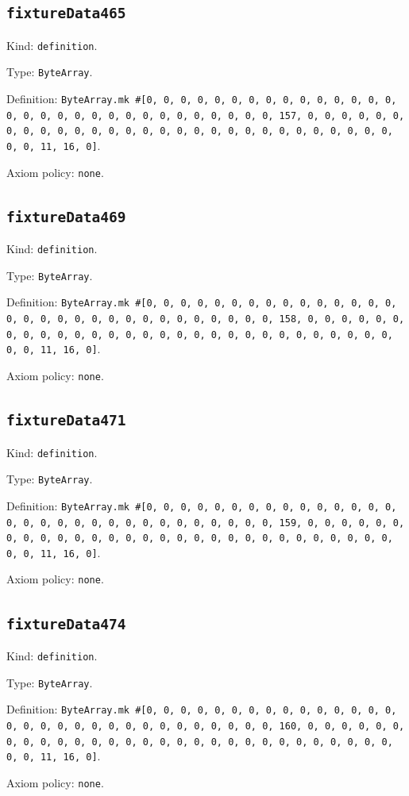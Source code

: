 \documentclass[11pt]{article}
\begin{document}
\subsection*{\texttt{fixtureData465}}
\noindent Kind: \texttt{definition}.\par
\noindent Type: \texttt{ByteArray}.\par
\noindent Definition: \texttt{ByteArray.mk \#[0, 0, 0, 0, 0, 0, 0, 0, 0, 0, 0, 0, 0, 0, 0, 0, 0, 0, 0, 0, 0, 0, 0, 0, 0, 0, 0, 0, 0, 0, 0, 157, 0, 0, 0, 0, 0, 0, 0, 0, 0, 0, 0, 0, 0, 0, 0, 0, 0, 0, 0, 0, 0, 0, 0, 0, 0, 0, 0, 0, 0, 0, 0, 11, 16, 0]}.\par
\noindent Axiom policy: \texttt{none}.\par
\subsection*{\texttt{fixtureData469}}
\noindent Kind: \texttt{definition}.\par
\noindent Type: \texttt{ByteArray}.\par
\noindent Definition: \texttt{ByteArray.mk \#[0, 0, 0, 0, 0, 0, 0, 0, 0, 0, 0, 0, 0, 0, 0, 0, 0, 0, 0, 0, 0, 0, 0, 0, 0, 0, 0, 0, 0, 0, 0, 158, 0, 0, 0, 0, 0, 0, 0, 0, 0, 0, 0, 0, 0, 0, 0, 0, 0, 0, 0, 0, 0, 0, 0, 0, 0, 0, 0, 0, 0, 0, 0, 11, 16, 0]}.\par
\noindent Axiom policy: \texttt{none}.\par
\subsection*{\texttt{fixtureData471}}
\noindent Kind: \texttt{definition}.\par
\noindent Type: \texttt{ByteArray}.\par
\noindent Definition: \texttt{ByteArray.mk \#[0, 0, 0, 0, 0, 0, 0, 0, 0, 0, 0, 0, 0, 0, 0, 0, 0, 0, 0, 0, 0, 0, 0, 0, 0, 0, 0, 0, 0, 0, 0, 159, 0, 0, 0, 0, 0, 0, 0, 0, 0, 0, 0, 0, 0, 0, 0, 0, 0, 0, 0, 0, 0, 0, 0, 0, 0, 0, 0, 0, 0, 0, 0, 11, 16, 0]}.\par
\noindent Axiom policy: \texttt{none}.\par
\subsection*{\texttt{fixtureData474}}
\noindent Kind: \texttt{definition}.\par
\noindent Type: \texttt{ByteArray}.\par
\noindent Definition: \texttt{ByteArray.mk \#[0, 0, 0, 0, 0, 0, 0, 0, 0, 0, 0, 0, 0, 0, 0, 0, 0, 0, 0, 0, 0, 0, 0, 0, 0, 0, 0, 0, 0, 0, 0, 160, 0, 0, 0, 0, 0, 0, 0, 0, 0, 0, 0, 0, 0, 0, 0, 0, 0, 0, 0, 0, 0, 0, 0, 0, 0, 0, 0, 0, 0, 0, 0, 11, 16, 0]}.\par
\noindent Axiom policy: \texttt{none}.\par
\end{document}
